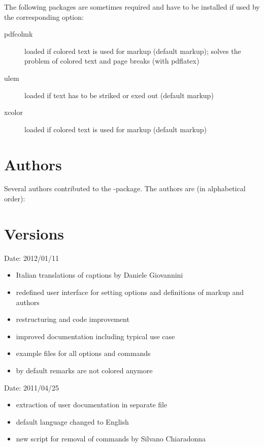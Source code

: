 The following packages are sometimes required and have to be installed if used by the corresponding option:
\begin{description}
	\item [pdfcolmk] loaded if colored text is used for markup (default markup); solves the problem of colored text and page breaks (with pdflatex)
	\item [ulem] loaded if text has to be striked or exed out (default markup)
	\item [xcolor] loaded if colored text is used for markup (default markup)
\end{description}


\section{Authors}
\label{sec:authors}

Several authors contributed to the -package.
The authors are (in alphabetical order):



\section{Versions}
\label{sec:versions}


Date: 2012/01/11
\begin{itemize}
	\item Italian translations of captions by Daniele Giovannini
	\item redefined user interface for setting options and definitions of markup and authors
	\item restructuring and code improvement
	\item improved documentation including typical use case
	\item example files for all options and commands
	\item by default remarks are not colored anymore
\end{itemize}


Date: 2011/04/25
\begin{itemize}
	\item extraction of user documentation in separate file
	\item default language changed to English
	\item new script for removal of  commands by Silvano Chiaradonna
\end{itemize}


